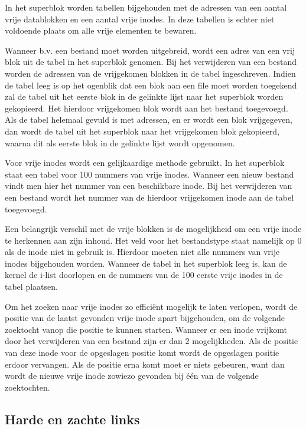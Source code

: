 In het superblok worden tabellen bijgehouden met de adressen van een aantal vrije datablokken en een aantal vrije
inodes. In deze tabellen is echter niet voldoende plaats om alle vrije elementen te bewaren.

Wanneer b.v. een bestand moet worden uitgebreid, wordt een adres van een vrij blok uit de tabel in het superblok
genomen. Bij het verwijderen van een bestand worden de adressen van de vrijgekomen blokken in de tabel ingeschreven.
Indien de tabel leeg is op het ogenblik dat een blok aan een file moet worden toegekend zal de tabel uit het eerste
blok in de gelinkte lijst naar het superblok worden gekopieerd. Het hierdoor vrijgekomen blok wordt aan het bestand
toegevoegd. Als de tabel helemaal gevuld is met adressen, en er wordt een blok vrijgegeven, dan wordt de tabel uit
het superblok naar het vrijgekomen blok gekopieerd, waarna dit als eerste blok in de gelinkte lijst wordt opgenomen.

Voor vrije inodes wordt een gelijkaardige methode gebruikt. In het superblok staat een tabel voor 100 nummers van
vrije inodes.  Wanneer een nieuw bestand vindt men hier het nummer van een beschikbare inode. Bij het verwijderen
van een bestand wordt het nummer van de hierdoor vrijgekomen inode aan de tabel toegevoegd.

Een belangrijk verschil met de vrije blokken is de mogelijkheid om een vrije inode te herkennen aan zijn inhoud. Het
veld voor het bestandstype staat namelijk op 0 als de inode niet in gebruik is. Hierdoor moeten niet alle nummers van
vrije inodes bijgehouden worden. Wanneer de tabel in het superblok leeg is, kan de kernel de i-list doorlopen en de
nummers van de 100 eerste vrije inodes in de tabel plaatsen.

Om het zoeken naar vrije inodes zo effici\"ent mogelijk te laten verlopen, wordt de positie van de laatst gevonden
vrije inode apart bijgehouden, om de volgende zoektocht vanop die positie te kunnen starten. Wanneer er een inode
vrijkomt door het verwijderen van een bestand zijn er dan 2 mogelijkheden. Als de positie van deze inode voor de
opgeslagen positie komt wordt de opgeslagen positie erdoor vervangen. Als de positie erna komt moet er niets gebeuren,
want dan wordt de nieuwe vrije inode zowiezo gevonden bij \'e\'en van de volgende zoektochten.

\subsection{Harde en zachte links}

